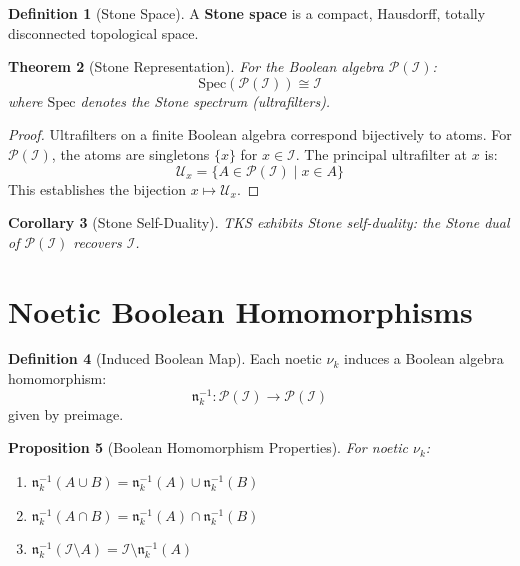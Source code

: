 \documentclass[11pt,twoside,openright]{book}
\theoremstyle{definition}
\newtheorem{definition}{Definition}[chapter]
\theoremstyle{plain}
\newtheorem{theorem}[definition]{Theorem}
\newtheorem{proposition}[definition]{Proposition}
\newtheorem{corollary}[definition]{Corollary}
\theoremstyle{remark}
\newcommand{\Ideas}{\mathcal{I}}
\newcommand{\noe}[1]{\nu_{#1}}
\newcommand{\Spec}{\mathrm{Spec}}            %
\begin{document}
\begin{definition}[Stone Space]
\label{def:stone-space}
A \textbf{Stone space} is a compact, Hausdorff, totally disconnected topological space.
\end{definition}

\begin{theorem}[Stone Representation]
\label{thm:stone-representation}
For the Boolean algebra $\mathcal{P}(\Ideas)$:
\[
\Spec(\mathcal{P}(\Ideas)) \cong \Ideas
\]
where $\Spec$ denotes the Stone spectrum (ultrafilters).
\end{theorem}

\begin{proof}
Ultrafilters on a finite Boolean algebra correspond bijectively to atoms. For $\mathcal{P}(\Ideas)$, the atoms are singletons $\{x\}$ for $x \in \Ideas$. The principal ultrafilter at $x$ is:
\[
\mathcal{U}_x = \{A \in \mathcal{P}(\Ideas) \mid x \in A\}
\]
This establishes the bijection $x \mapsto \mathcal{U}_x$.
\end{proof}

\begin{corollary}[Stone Self-Duality]
\label{cor:stone-self-dual}
TKS exhibits Stone self-duality: the Stone dual of $\mathcal{P}(\Ideas)$ recovers $\Ideas$.
\end{corollary}

\section{Noetic Boolean Homomorphisms}

\begin{definition}[Induced Boolean Map]
\label{def:induced-boolean}
Each noetic $\noe{k}$ induces a Boolean algebra homomorphism:
\[
\mathfrak{n}_k^{-1} : \mathcal{P}(\Ideas) \to \mathcal{P}(\Ideas)
\]
given by preimage.
\end{definition}

\begin{proposition}[Boolean Homomorphism Properties]
\label{prop:boolean-homo}
For noetic $\noe{k}$:
\begin{enumerate}
  \item $\mathfrak{n}_k^{-1}(A \cup B) = \mathfrak{n}_k^{-1}(A) \cup \mathfrak{n}_k^{-1}(B)$
  \item $\mathfrak{n}_k^{-1}(A \cap B) = \mathfrak{n}_k^{-1}(A) \cap \mathfrak{n}_k^{-1}(B)$
  \item $\mathfrak{n}_k^{-1}(\Ideas \setminus A) = \Ideas \setminus \mathfrak{n}_k^{-1}(A)$
\end{enumerate}
\end{proposition}
\end{document}
